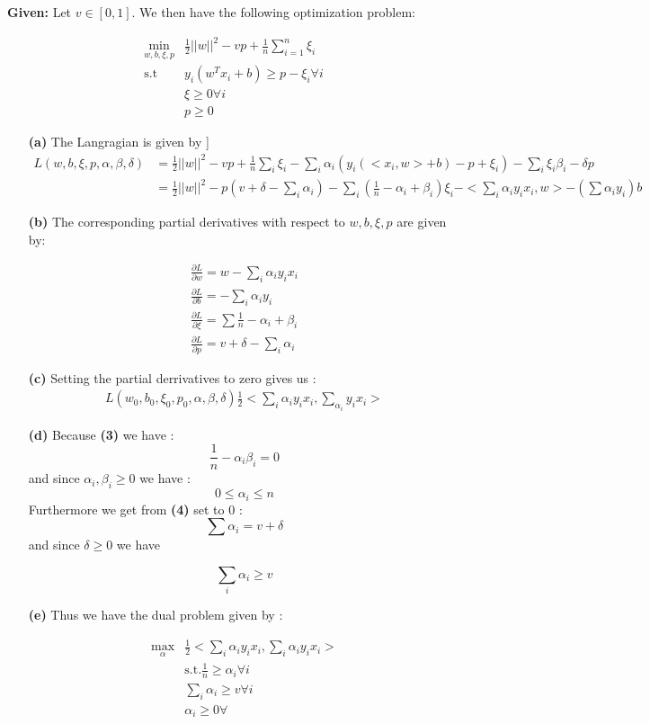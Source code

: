 
\textbf{Given:} Let $v \in [0,1]$. We then have the following optimization problem:

\begin{align*}
    \min_{w,b,\xi,p} &\frac{1}{2}||w||^2-vp+\frac{1}{n}\sum_{i=1}^n \xi_i\\
    \text{s.t} &y_i(w^Tx_i+b)\geq p-\xi_i \forall i \\
    &\xi \geq 0 \forall i\\
    &p\geq 0
\end{align*}


\begin{itemize}
    \item[\textbf{(a)}] The Langragian is given by 
    ]\begin{align*}
        L(w,b,\xi,p,\alpha, \beta, \delta)  &= \frac{1}{2}||w||^2 -vp +\frac{1}{n}\sum_i\xi_i - \sum_i\alpha_i(y_i(<x_i,w>+b)-p+\xi_i) -\sum_i\xi_i\beta_i - \delta p\\
                                            &=\frac{1}{2}||w||^2-p(v+\delta-\sum_i\alpha_i)-\sum_i(\frac{1}{n}-\alpha_i+\beta_i)\xi_i-<\sum_i\alpha_iy_ix_i,w>-(\sum\alpha_iy_i)b
    \end{align*} 

\item[\textbf{(b)}]  The corresponding partial derivatives with respect to $w, b, \xi, p$ are given by:

\begin{align}
    \frac{\partial L}{\partial w}= w -\sum_i \alpha_iy_ix_i \\
    \frac{\partial L}{\partial b}= -\sum_i\alpha_iy_i\\
    \frac{\partial L}{\partial \xi}= \sum \frac{1}{n}-\alpha_i+\beta_i\\
    \frac{\partial L}{\partial p}= v+\delta -\sum_i\alpha_i
\end{align}
\item[\textbf{(c)}] Setting the partial derrivatives to zero gives us :
\begin{align*}
    L(w_0,b_0,\xi_0,p_0,\alpha, \beta, \delta)\frac{1}{2}<\sum_i\alpha_iy_ix_i,\sum_\alpha_iy_ix_i>
\end{align*} 
\item[\textbf{(d)}] Because \textbf{(3) } we have :
\[
\frac{1}{n}-\alpha_i \beta_i =0   
\]  
and since $\alpha_i,\beta_i\geq 0$ we have :
\[
0\leq \alpha_i \leq n    
\]
Furthermore we get from \textbf{(4)} set to 0 :
\[
\sum \alpha_i =v+\delta    
\]
and since $\delta \geq 0$ we have 

\[
\sum_i\alpha_i \geq v    
\]

\item[\textbf{(e)}] Thus we have the dual problem given by :

\begin{align*}
    \max_\alpha & \frac{1}{2} <\sum_i\alpha_iy_ix_i,\sum_i\alpha_iy_ix_i>\\
                &\text{s.t.} \frac{1}{n}\geq \alpha_i \forall i\\
                &\sum_i\alpha_i \geq v \forall i\\
                &\alpha_i\geq 0 \forall 
\end{align*} 
\end{itemize}
